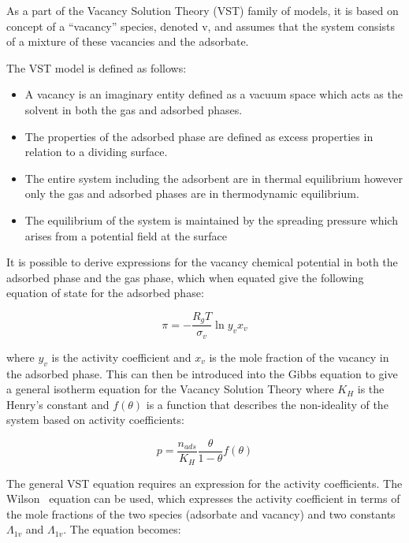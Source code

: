 As a part of the Vacancy Solution Theory (VST) family of models, it is based on concept
of a “vacancy” species, denoted v, and assumes that the system consists of a
mixture of these vacancies and the adsorbate.

The VST model is defined as follows:

\begin{itemize}
    
    \item A vacancy is an imaginary entity defined as a vacuum space
    which acts as the solvent in both the gas and adsorbed phases.
    \item The properties of the adsorbed phase are defined as excess properties
    in relation to a dividing surface.
    \item The entire system including the adsorbent are in thermal equilibrium
    however only the gas and adsorbed phases are in thermodynamic equilibrium.
    \item The equilibrium of the system is maintained by the spreading pressure
    which arises from a potential field at the surface

\end{itemize}
    
It is possible to derive expressions for the vacancy chemical potential in both
the adsorbed phase and the gas phase, which when equated give the following equation
of state for the adsorbed phase:

\begin{equation}
    \pi = - \frac{R_g T}{\sigma_v} \ln{y_v x_v}
\end{equation}

where \(y_v\) is the activity coefficient and  \(x_v\) is the mole fraction of
the vacancy in the adsorbed phase.
This can then be introduced into the Gibbs equation to give a general isotherm equation
for the Vacancy Solution Theory where \(K_H\) is the Henry’s constant and
\(f(\theta)\) is a function that describes the non-ideality of the system based
on activity coefficients:

\begin{equation}
    p = \frac{n_{ads}}{K_H} \frac{\theta}{1-\theta} f(\theta)
\end{equation}

The general VST equation requires an expression for the activity coefficients.
The Wilson~\cite{suwanayuenGasAdsorptionIsotherm1980} equation can be used, 
which expresses the activity coefficient in terms
of the mole fractions of the two species (adsorbate and vacancy) and two constants
\(\Lambda_{1v}\) and \(\Lambda_{1v}\). The equation becomes:

